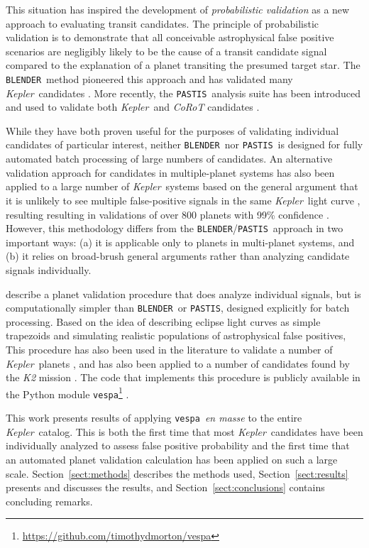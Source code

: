 \documentclass{emulateapj}
\newcommand{\sectionname}{Section}
\newcommand{\Sect}[1]{\sectionname~\ref{sect:#1}}
\newcommand{\sect}[1]{\Sect{#1}}
\newcommand{\kepler}{\textit{Kepler}}
\newcommand{\vespa}{\texttt{vespa}}
\newcommand{\pastis}{\verb|PASTIS|}
\newcommand{\blender}{\verb|BLENDER|}
\begin{document}
This situation has inspired the development of \emph{probabilistic
validation} as a new approach to evaluating transit candidates.  The
principle of probabilistic validation is to demonstrate that all
conceivable astrophysical false positive scenarios are negligibly
likely to be the cause of a transit candidate signal compared to the
explanation of a planet transiting the presumed target star.  The
\blender\ method pioneered this approach and has validated many
\kepler\ candidates
\citep[e.g.,][]{Borucki:2012,Kipping:2014,Torres:2015}.   More
recently, the \pastis\ analysis suite has been introduced
\citep{Diaz:2014} and used to validate both \kepler\ and
\textit{CoRoT} candidates \citep[e.g.,][]{Santerne:2014,Moutou:2014}.

While they have both proven useful for the purposes of validating
individual candidates of particular interest, neither \blender\ nor
\pastis\ is designed for fully automated batch processing of large
numbers of candidates.  An alternative validation approach for
candidates in multiple-planet systems has also been applied to a large
number of \kepler\ systems based on the general argument that it is
unlikely to see multiple false-positive signals in the same \kepler\
light curve \citep{Lissauer:2012}, resulting resulting in validations
of over 800 planets with 99\% confidence
\citep{Lissauer:2014,Rowe:2014}. However, this methodology differs
from the \blender/\pastis\ approach in two important ways: (a) it is
applicable only to planets in multi-planet systems, and (b) it relies on  
broad-brush general arguments rather than analyzing candidate signals
individually.

\citet{Morton:2012} describe a planet validation procedure that does
analyze individual signals, but is computationally simpler than
\blender\ or \pastis, designed explicitly for batch processing.  Based
on the idea of describing eclipse light curves as simple trapezoids
and simulating realistic populations of astrophysical false positives,
This procedure has also been used in the literature to validate a
number of \kepler\ planets
\citep[e.g.,][]{Muirhead:2012,Dawson:2012,Swift:2013}, and has also
been applied to a number of candidates found by the \textit{K2}
mission \citep{Montet:2015,Becker:2015}.  The code that implements
this procedure is publicly available in the Python module
\vespa\footnote{\url{https://github.com/timothydmorton/vespa}}
\citep{vespa}.

This work presents results of applying \vespa\ \emph{en masse} to the
entire \kepler\ catalog. This is both the first time that most
\kepler\ candidates have been individually analyzed to assess false
positive probability and the first time that an automated planet
validation calculation has been applied on such a large scale.  
\Sect{methods} describes the methods used, \sect{results} presents and
discusses the results, and \sect{conclusions} contains concluding
remarks.  
\end{document}
